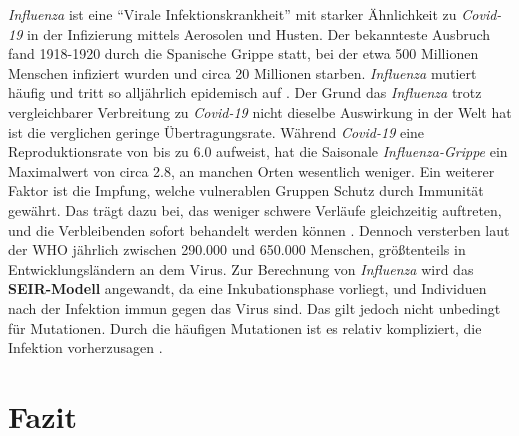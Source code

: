 \documentclass[12pt]{scrartcl} %
\begin{document}
\textsl{Influenza} ist eine "`Virale Infektionskrankheit"' mit starker Ähnlichkeit zu \textsl{Covid-19} in der Infizierung mittels Aerosolen und Husten. Der bekannteste Ausbruch fand 1918-1920 durch die Spanische Grippe statt, bei der etwa 500 Millionen Menschen infiziert wurden und circa 20 Millionen starben. \textsl{Influenza} mutiert häufig und tritt so alljährlich epidemisch auf \cite{2, 3}. Der Grund das \textit{Influenza} trotz vergleichbarer Verbreitung zu \textsl{Covid-19} nicht dieselbe Auswirkung in der Welt hat ist die verglichen geringe Übertragungsrate. Während \textsl{Covid-19} eine Reproduktionsrate von bis zu 6.0 aufweist, hat die Saisonale \textsl{Influenza-Grippe} ein Maximalwert von circa 2.8, an manchen Orten wesentlich weniger. Ein weiterer Faktor ist die Impfung, welche vulnerablen Gruppen Schutz durch Immunität gewährt. Das trägt dazu bei, das weniger schwere Verläufe gleichzeitig auftreten, und die Verbleibenden sofort behandelt werden können \cite{3}. Dennoch versterben laut der WHO jährlich zwischen 290.000 und 650.000 Menschen, größtenteils in Entwicklungsländern an dem Virus. Zur Berechnung von \textsl{Influenza} wird das \textbf{SEIR-Modell} angewandt, da eine Inkubationsphase vorliegt, und Individuen nach der Infektion immun gegen das Virus sind. Das gilt jedoch nicht unbedingt für Mutationen. Durch die häufigen Mutationen ist es relativ kompliziert, die Infektion vorherzusagen \cite{11}.


\newpage
\section{Fazit}
\end{document}
